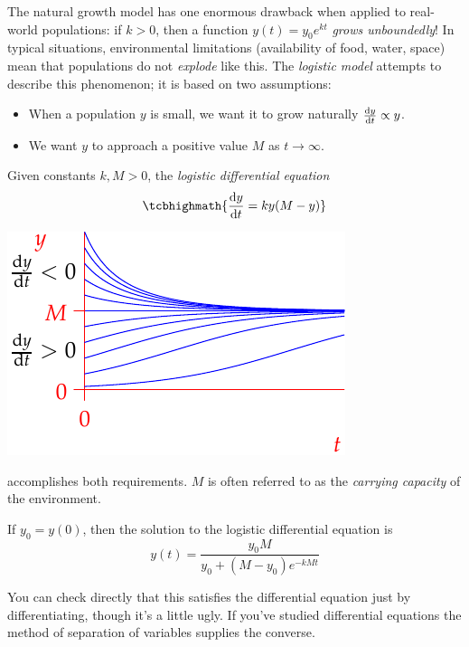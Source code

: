 The natural growth model has one enormous drawback when applied to real-world populations: if $k>0$, then a function $y(t)=y_0e^{kt}$ \emph{grows unboundedly}! In typical situations, environmental limitations (availability of food, water, space) mean that populations do not \emph{explode} like this. The \emph{logistic model} attempts to describe this phenomenon; it is based on two assumptions:\par
\begin{minipage}[t]{0.6\linewidth}\vspace{-5pt}
\begin{itemize}
  \item When a population $y$ is small, we want it to grow naturally $\diff[y]{t}\propto y$.
	\item We want $y$ to approach a positive value $M$ as $t\to \infty$.
\end{itemize}
Given constants $k,M>0$, the \emph{logistic differential equation}
\[\tcbhighmath{\diff[y]{t}=ky(M-y)}\]
\end{minipage}\hfill
\begin{minipage}[t]{0.39\linewidth}\vspace{0pt}
\flushright\includegraphics{logisticsf}
\end{minipage}\medbreak
accomplishes both requirements. $M$ is often referred to as the \emph{carrying capacity} of the environment.



\begin{thm}{}{}
If $y_0=y(0)$, then the solution to the logistic differential equation is
\[y(t)=\frac{y_0M}{y_0+(M-y_0)e^{-kMt}}\]
\end{thm}

You can check directly that this satisfies the differential equation just by differentiating, though it's a little ugly. If you've studied differential equations the method of separation of variables supplies the converse.


